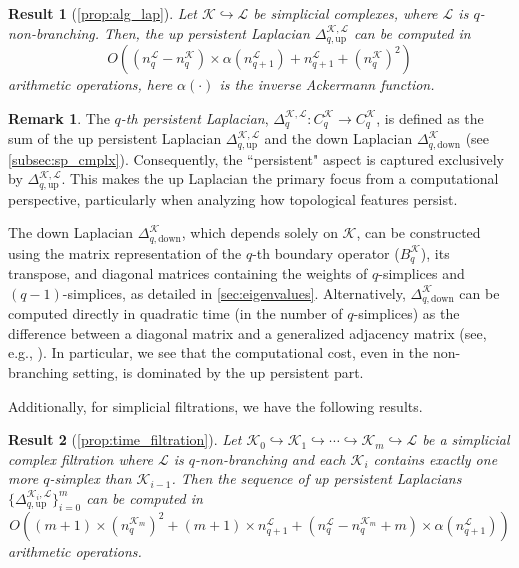 \documentclass{article}
\newtheorem{resultx}{Result}
\theoremstyle{definition}
\newtheorem{remark}[theorem]{Remark}
\newcommand{\KK}{\mathcal{K}}
\newcommand{\LL}{\mathcal{L}}
\begin{document}
\begin{resultx}[\cref{prop:alg_lap}]\label{result:lap_arithm}
    Let $\KK \hookrightarrow \LL$ be simplicial complexes, where $\LL$ is $q$-non-branching. Then, the up persistent Laplacian $\Delta_{q, \mathrm{up}}^{\KK, \LL}$ can be computed in 
    \[
    O\left((n_q^\LL-n_q^\KK)\times \alpha(n_{q+1}^\LL) + n_{q+1}^\LL+(n_q^\KK)^2\right)
    \]
    arithmetic operations,
    {here $\alpha(\cdot)$ is the inverse Ackermann function.}
\end{resultx}
\begin{remark}\label{rem:full-laplacian}
The \emph{$q$-th persistent Laplacian}, $\Delta_q^{\KK, \LL}: C_q^\KK \to C_q^\KK$, is defined as the sum of the up persistent Laplacian $\Delta_{q, \mathrm{up}}^{\KK, \LL}$ and the down Laplacian $\Delta_{q, \mathrm{down}}^{\KK}$ (see \cref{subsec:sp_cmplx}).
Consequently, the ``persistent" aspect is captured exclusively by $\Delta_{q, \mathrm{up}}^{\KK, \LL}$. This makes the up Laplacian the primary focus from a computational perspective, particularly when analyzing how topological features persist.

The down Laplacian $\Delta_{q, \mathrm{down}}^{\KK}$, which depends solely on $\KK$, can be constructed using the matrix representation of the $q$-th boundary operator ($B_q^\KK$), its transpose, and diagonal matrices containing the weights of $q$-simplices and $(q-1)$-simplices, as detailed in \cref{sec:eigenvalues}. Alternatively, $\Delta_{q, \mathrm{down}}^{\KK}$ can be computed directly in quadratic time (in the number of $q$-simplices) as the difference between a diagonal matrix and a generalized adjacency matrix (see, e.g., \cite[SM1]{pers_lap}). In particular, we see that the computational cost, even in the non-branching setting, is dominated by the up persistent part.
\end{remark}

Additionally, for simplicial filtrations, we have the following results.

\begin{resultx}[\cref{prop:time_filtration}]\label{result:filt}
Let $\KK_0\hookrightarrow\KK_1 \hookrightarrow\cdots\hookrightarrow \KK_m\hookrightarrow \LL$ be a simplicial complex filtration where $\LL$ is $q$-non-branching and each $\KK_i$ contains exactly one more $q$-simplex than $\KK_{i-1}$.
Then the sequence of up persistent Laplacians $\{\Delta_{q, \mathrm{up}}^{\KK_i, \LL}\}_{i=0}^m$ can be computed in 
\[
O\left((m+1)\times (n_q^{\KK_m})^2+(m+1)\times n_{q+1}^\LL+(n_q^\LL-n_q^{\KK_m}+m)\times \alpha(n_{q+1}^\LL)\right)
\]
arithmetic operations.
\end{resultx}
\end{document}
